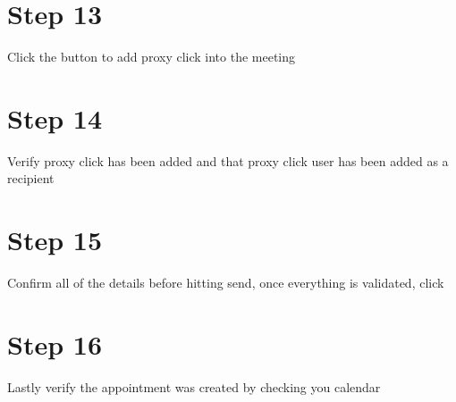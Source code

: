 \documentclass{../lib/lib-en}
\begin{document}

\newpage
\section*{\centering Step 13}
Click the  button to add proxy click into the meeting


\newpage
\section*{\centering Step 14}
Verify proxy click has been added and that proxy click user has been added as a recipient

\newpage
{}

\newpage
\section*{\centering Step 15}
Confirm all of the details before hitting send, once everything is validated, click 

\newpage
\section*{\centering Step 16}
Lastly verify the appointment was created by checking you calendar

\end{document}
